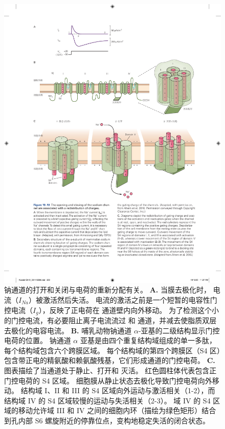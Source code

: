 \begin{figure}[htbp]
	\centering
	\includegraphics[width=1.0\linewidth]{chap10/fig_10_10}
	\caption{钠通道的打开和关闭与电荷的重新分配有关。
		\textbf{A.} 当膜去极化时， 电流（$I_{Na}$）被激活然后失活。
		 电流的激活之前是一个短暂的电容性门控电流（$I_g$），反映了正电荷在  通道壁内向外移动。
		为了检测这个小的门控电流，有必要阻止离子电流流过  和  通道，并减去使脂质双层去极化的电容电流\cite{armstrong1979fast}。
		\textbf{B.} 哺乳动物钠通道 $\alpha$-亚基的二级结构显示门控电荷的位置。
		钠通道 $\alpha$ 亚基是由四个重复结构域组成的单一多肽，每个结构域包含六个跨膜区域。 每个结构域的第四个跨膜区（S4 区）包含带正电的精氨酸和赖氨酸残基，它们形成通道的门控电荷\cite{ahern2016hitchhiker}。
		\textbf{C.} 图表描绘了当通道处于静止、打开和 灭活。 红色圆柱体代表包含正门控电荷的 S4 区域。
		细胞膜从静止状态去极化导致门控电荷向外移动。
		结构域 I、II 和 III 的 S4 区域向外运动与激活相关（1-2），而结构域 IV 的 S4 区域较慢的运动与失活相关（2-3）。
		域 IV 的 S4 区域的移动允许域 III 和 IV 之间的细胞内环（描绘为绿色矩形）结合到孔内部 S6 螺旋附近的停靠位点，变构地稳定失活的闭合状态\cite{ahern2016hitchhiker}。}
	\label{fig:10_10}
\end{figure}



